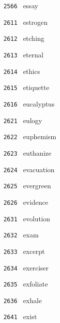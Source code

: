 \documentclass[11pt]{article}
\begin{document}
\begin{multicols}{6}
\noindent \texttt{ 2566 } \hspace{1mm} essay  \par
\noindent \texttt{ 2611 } \hspace{1mm} estrogen  \par
\noindent \texttt{ 2612 } \hspace{1mm} etching  \par
\noindent \texttt{ 2613 } \hspace{1mm} eternal  \par
\noindent \texttt{ 2614 } \hspace{1mm} ethics  \par
\noindent \texttt{ 2615 } \hspace{1mm} etiquette  \par
\noindent \texttt{ 2616 } \hspace{1mm} eucalyptus  \par
\noindent \texttt{ 2621 } \hspace{1mm} eulogy  \par
\noindent \texttt{ 2622 } \hspace{1mm} euphemism  \par
\noindent \texttt{ 2623 } \hspace{1mm} euthanize  \par
\noindent \texttt{ 2624 } \hspace{1mm} evacuation  \par
\noindent \texttt{ 2625 } \hspace{1mm} evergreen  \par
\noindent \texttt{ 2626 } \hspace{1mm} evidence  \par
\noindent \texttt{ 2631 } \hspace{1mm} evolution  \par
\noindent \texttt{ 2632 } \hspace{1mm} exam  \par
\noindent \texttt{ 2633 } \hspace{1mm} excerpt  \par
\noindent \texttt{ 2634 } \hspace{1mm} exerciser  \par
\noindent \texttt{ 2635 } \hspace{1mm} exfoliate  \par
\noindent \texttt{ 2636 } \hspace{1mm} exhale  \par
\noindent \texttt{ 2641 } \hspace{1mm} exist  \par

\end{multicols}
\end{document}
